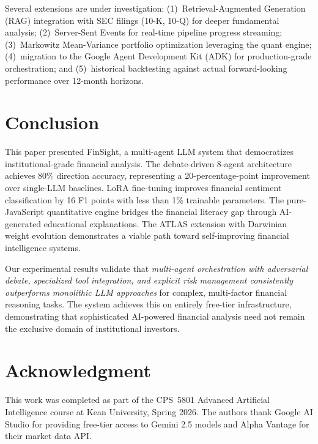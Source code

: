 \documentclass[conference]{IEEEtran}
\begin{document}
Several extensions are under investigation: (1)~Retrieval-Augmented Generation (RAG) integration with SEC filings (10-K, 10-Q) for deeper fundamental analysis; (2)~Server-Sent Events for real-time pipeline progress streaming; (3)~Markowitz Mean-Variance portfolio optimization leveraging the quant engine; (4)~migration to the Google Agent Development Kit (ADK) for production-grade orchestration; and (5)~historical backtesting against actual forward-looking performance over 12-month horizons.


\section{Conclusion}
\label{sec:conclusion}

This paper presented FinSight, a multi-agent LLM system that democratizes institutional-grade financial analysis. The debate-driven 8-agent architecture achieves 80\% direction accuracy, representing a 20-percentage-point improvement over single-LLM baselines. LoRA fine-tuning improves financial sentiment classification by 16 F1 points with less than 1\% trainable parameters. The pure-JavaScript quantitative engine bridges the financial literacy gap through AI-generated educational explanations. The ATLAS extension with Darwinian weight evolution demonstrates a viable path toward self-improving financial intelligence systems.

Our experimental results validate that \textit{multi-agent orchestration with adversarial debate, specialized tool integration, and explicit risk management consistently outperforms monolithic LLM approaches} for complex, multi-factor financial reasoning tasks. The system achieves this on entirely free-tier infrastructure, demonstrating that sophisticated AI-powered financial analysis need not remain the exclusive domain of institutional investors.


\section*{Acknowledgment}

This work was completed as part of the CPS~5801 Advanced Artificial Intelligence course at Kean University, Spring 2026. The authors thank Google AI Studio for providing free-tier access to Gemini 2.5 models and Alpha Vantage for their market data API.



\end{document}

